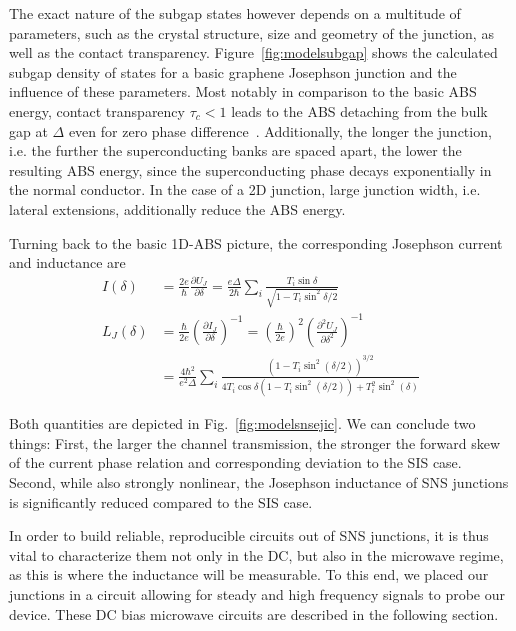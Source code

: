 The exact nature of the subgap states however depends on a multitude of parameters, such as the crystal structure, size and geometry of the junction, as well as the contact transparency.
%
Figure~\ref{fig:modelsubgap} shows the calculated subgap density of states for a basic graphene Josephson junction and the influence of these parameters.
%
Most notably in comparison to the basic ABS energy, contact transparency $\tau_c<1$ leads to the ABS detaching from the bulk gap at $\Delta$ even for zero phase difference~\cite{bretheauTunnellingSpectroscopyAndreev2017a}.
%
Additionally, the longer the junction, i.e. the further the superconducting banks are spaced apart, the lower the resulting ABS energy, since the superconducting phase decays exponentially in the normal conductor.
%
In the case of a 2D junction, large junction width, i.e. lateral extensions, additionally reduce the ABS energy.




Turning back to the basic 1D-ABS picture, the corresponding Josephson current and inductance are 
\begin{align}
I(\delta) &= \frac{2e}{\hbar}\frac{\partial U_J}{\partial\delta} = \frac{e\Delta}{2\hbar}\sum_i\frac{T_i\sin\delta}{\sqrt{1-T_i\sin^2\delta/2}} \\
L_J(\delta) &= \frac{\hbar}{2e}\left( \frac{\partial I_J}{\partial\delta} \right)^{-1} = \left(\frac{\hbar}{2e}\right)^2\left(\frac{\partial^2U_J}{\partial\delta^2}\right)^{-1} \\
&= \frac{4\hbar^2}{e^2\Delta}\sum_i \frac{\left(1-T_i\sin^2(\delta/2)\right)^{3/2}}{4T_i\cos\delta\left(1-T_i\sin^2(\delta/2)\right)+T_i^2\sin^2(\delta)}
\end{align}

Both quantities are depicted in Fig.~\ref{fig:modelsnsejic}.
%
We can conclude two things:
%
First, the larger the channel transmission, the stronger the forward skew of the current phase relation and corresponding deviation to the SIS case.
%
Second, while also strongly nonlinear, the Josephson inductance of SNS junctions is significantly reduced compared to the SIS case.

In order to build reliable, reproducible circuits out of SNS junctions, it is thus vital to characterize them not only in the DC, but also in the microwave regime, as this is where the inductance will be measurable.
%
To this end, we placed our junctions in a circuit allowing for steady and high frequency signals to probe our device.
%
These DC bias microwave circuits are described in the following section.

